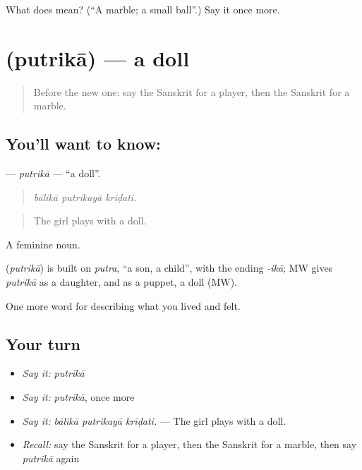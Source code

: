 \begin{tcolorbox}[breakable,colback=teal!4,colframe=teal!35!black,title={Before you move on}]
What does  mean? (\textquotedblleft{}A marble; a small ball\textquotedblright{}.) Say it once more.
\end{tcolorbox}
\section[\texorpdfstring{\sk{पुत्रिका} (putrikā)}{पुत्रिका (putrikā)}]{ (putrikā) — a doll}

\label{lesson:SA-C517-putrika}



\begin{quote}
Before the new one: say the Sanskrit for a player, then the Sanskrit for a marble.
\end{quote}

\subsection*{You'll want to know: }
\textbf{} — \emph{putrikā} — \textquotedblleft{}a doll\textquotedblright{}.

\begin{quote}
  
\end{quote}

\begin{quote}
\emph{bālikā putrikayā krīḍati.}
\end{quote}

\begin{quote}
The girl plays with a doll.
\end{quote}

A feminine noun.

\begin{cousinweb}
\textbf{} (\emph{putrikā}) is built on \emph{putra}, \textquotedblleft{}a son, a child\textquotedblright{}, with the ending \emph{-ikā}; MW gives \emph{putrikā} as a daughter, and as a puppet, a doll (MW).
\end{cousinweb}

\begin{grammarlens}[title={What you've built}]
One more word for describing what you lived and felt.
\end{grammarlens}

\subsection*{Your turn}
\begin{itemize}
\raggedright
  \item \emph{Say it:} \emph{putrikā}
  \item \emph{Say it:} \emph{putrikā}, once more
  \item \emph{Say it:} \emph{bālikā putrikayā krīḍati.} — The girl plays with a doll.
  \item \emph{Recall:} say the Sanskrit for a player, then the Sanskrit for a marble, then say \emph{putrikā} again
\end{itemize}

